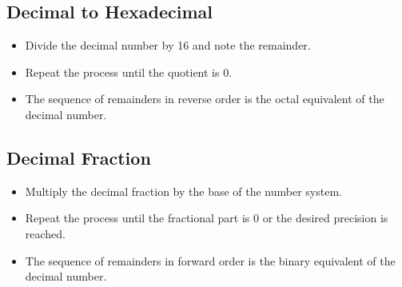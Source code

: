 \documentclass[12pt letter]{report}
\begin{document}

\subsection{Decimal to Hexadecimal}

\begin{itemize}
  \item Divide the decimal number by 16 and note the remainder.
  \item Repeat the process until the quotient is 0.
  \item The sequence of remainders in reverse order is the octal equivalent of the decimal number.
\end{itemize}


\subsection{Decimal Fraction}

\begin{itemize}
  \item Multiply the decimal fraction by the base of the number system.
  \item  Repeat the process until the fractional part is 0 or the desired precision is reached.
  \item The sequence of remainders in forward order is the binary equivalent of the decimal number.
\end{itemize}
\end{document}
